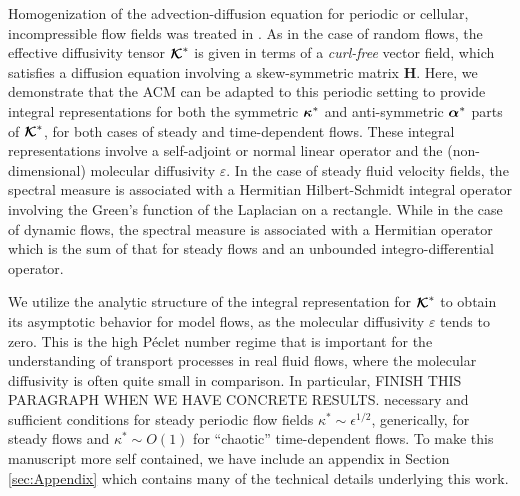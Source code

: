 \documentclass[11pt]{amsart}
\newcommand{\Hb}{\mathbf{H}}
\newcommand\Kbc{\mbox{\boldmath${\mathcal{K}}$}}
\newcommand\balpha{\mbox{\boldmath${\alpha}$}}
\newcommand\bkappa{\mbox{\boldmath${\kappa}$}}
\begin{document}
Homogenization of the advection-diffusion equation for periodic or
cellular, incompressible flow fields was treated in
\cite{Fannjiang:SIAM_JAM:333,Fannjiang:1997:1033}. As in the case of
random flows, the effective diffusivity tensor
$\Kbc^*$ is given in terms of a \emph{curl-free} vector field, which
satisfies a diffusion equation involving a skew-symmetric
matrix $\Hb$. Here, we demonstrate that the ACM can
be adapted to this periodic setting to provide integral
representations for both the symmetric $\bkappa^*$ and 
anti-symmetric $\balpha^*$ parts of $\Kbc^*$, for both cases of
steady and time-dependent flows. These integral representations
involve a self-adjoint or normal linear operator and the
(non-dimensional) molecular diffusivity $\varepsilon$. In the case of steady
fluid velocity fields, the spectral measure is associated with a
Hermitian Hilbert-Schmidt integral operator involving the Green's
function of the Laplacian on a rectangle. While in the case of dynamic 
flows, the spectral measure is associated with a Hermitian operator
which is the sum of that for steady flows and an unbounded
integro-differential operator.      
 

We utilize the analytic structure of the  integral
representation for $\Kbc^*$ to obtain its asymptotic behavior for
model flows, as the molecular diffusivity $\varepsilon$ tends to zero. This is
the high P\'{e}clet number regime that is important for the
understanding of transport processes in real fluid flows, where the
molecular diffusivity is often quite small in comparison. In
particular, FINISH THIS PARAGRAPH WHEN WE HAVE CONCRETE RESULTS.
necessary and sufficient conditions for steady periodic flow
fields $\kappa^*\sim\epsilon^{1/2}$, generically, for steady flows and $\kappa^*\sim O(1)$ for
``chaotic'' time-dependent flows. To make this manuscript more self
contained, we have include an appendix in Section \ref{sec:Appendix}
which contains many of the technical details underlying this work.

%
\end{document}
